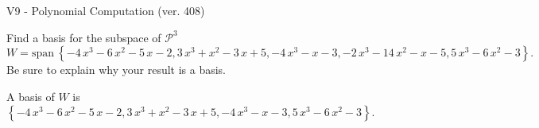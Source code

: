\begin{exercise}
  \begin{exerciseTitle}V9 - Polynomial Computation (ver. 408)\end{exerciseTitle}
  \begin{exerciseStatement}
    Find a basis for the subspace of \(\mathcal{P}^3\) 
\[W=\mathrm{span}\ \left\{-4 \, x^{3} - 6 \, x^{2} - 5 \, x - 2 , 3 \, x^{3} + x^{2} - 3 \, x + 5 , -4 \, x^{3} - x - 3 , -2 \, x^{3} - 14 \, x^{2} - x - 5 , 5 \, x^{3} - 6 \, x^{2} - 3\right\}.\]
 Be sure to explain why your result is a basis.


  \end{exerciseStatement}
  \begin{exerciseAnswer}
   A basis of \(W\) is  \(\left\{-4 \, x^{3} - 6 \, x^{2} - 5 \, x - 2 , 3 \, x^{3} + x^{2} - 3 \, x + 5 , -4 \, x^{3} - x - 3 , 5 \, x^{3} - 6 \, x^{2} - 3\right\}\).
  


  \end{exerciseAnswer}
\end{exercise}